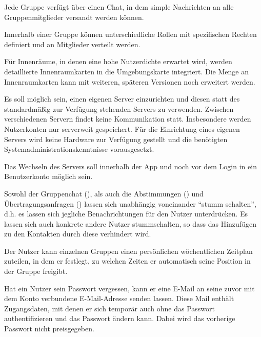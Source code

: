 \documentclass[parskip=full,11pt]{scrartcl}
\begin{document}
%
Jede Gruppe verfügt über einen Chat, in dem simple Nachrichten an alle
Gruppenmitglieder versandt werden können.

Innerhalb einer Gruppe können unterschiedliche Rollen
mit spezifischen Rechten definiert und an Mitglieder verteilt werden.

%
Für Innenräume, in denen eine hohe Nutzerdichte erwartet wird, werden
detaillierte Innenraumkarten in die Umgebungskarte integriert. Die Menge an
Innenraumkarten kann mit weiteren, späteren Versionen noch erweitert werden.

%
Es soll möglich sein, einen eigenen Server einzurichten und diesen statt des
standardmäßig zur Verfügung stehenden Servers zu verwenden.
Zwischen verschiedenen Servern findet keine Kommunikation statt.
Insbesondere werden Nutzerkonten nur serverweit gespeichert.
Für die Einrichtung eines eigenen Servers wird keine Hardware zur Verfügung
gestellt und die benötigten Systemadministrationskenntnisse vorausgesetzt.

%
Das Wechseln des Servers soll innerhalb der App und noch vor dem Login in ein
Benutzerkonto möglich sein.

%
Sowohl der Gruppenchat (), als auch die
Abstimmungen () und Übertragungsanfragen
() lassen sich unabhängig voneinander
\enquote{stumm schalten}, d.h. es lassen sich jegliche Benachrichtungen für den
Nutzer unterdrücken.
Es lassen sich auch konkrete andere Nutzer stummschalten, so dass das
Hinzufügen zu den Kontakten durch diese verhindert wird.

%
Der Nutzer kann einzelnen Gruppen einen persönlichen wöchentlichen Zeitplan
zuteilen, in dem er festlegt, zu welchen Zeiten er automatisch seine Position
in der Gruppe freigibt.

%
Hat ein Nutzer sein Passwort vergessen, kann er eine E-Mail an seine zuvor
mit dem Konto verbundene E-Mail-Adresse senden lassen.
Diese Mail enthält Zugangsdaten, mit denen er sich temporär auch ohne das
Passwort authentifizieren und das Passwort ändern kann.
Dabei wird das vorherige Passwort nicht preisgegeben.
\end{document}
